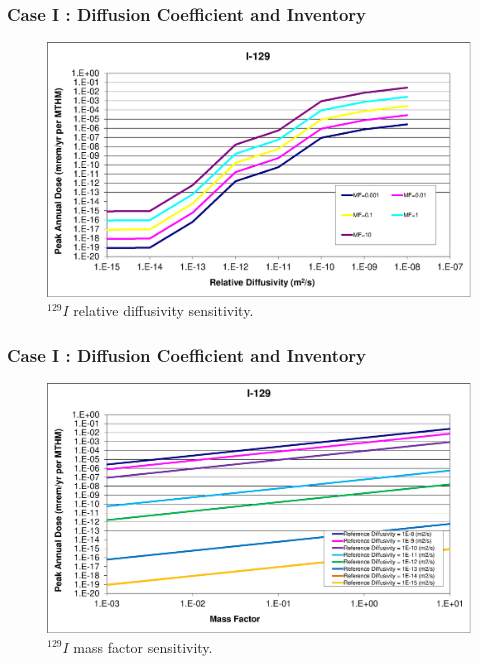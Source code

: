\begin{frame}[c]
  \frametitle{Case I : Diffusion Coefficient and Inventory}
\begin{figure}[ht]
\centering
\includegraphics[width=\linewidth]{./DiffCoeffAndInvEBSFail/I-129.eps}
\caption{$^{129}I$ relative diffusivity sensitivity.}
\label{fig:DCInvI129}
\end{figure}
\end{frame}

\begin{frame}[c]
  \frametitle{Case I : Diffusion Coefficient and Inventory}
\begin{figure}[ht]
\centering
\includegraphics[width=\linewidth]{DiffCoeffAndInvEBSFail/I-129-MF.eps}
\caption{$^{129}I$ mass factor sensitivity.}
\label{fig:DCInvI129MF}
\end{figure}
\end{frame}

